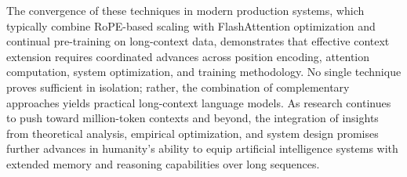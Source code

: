 The convergence of these techniques in modern production systems, which typically combine RoPE-based scaling with FlashAttention optimization and continual pre-training on long-context data, demonstrates that effective context extension requires coordinated advances across position encoding, attention computation, system optimization, and training methodology. No single technique proves sufficient in isolation; rather, the combination of complementary approaches yields practical long-context language models. As research continues to push toward million-token contexts and beyond, the integration of insights from theoretical analysis, empirical optimization, and system design promises further advances in humanity's ability to equip artificial intelligence systems with extended memory and reasoning capabilities over long sequences.
